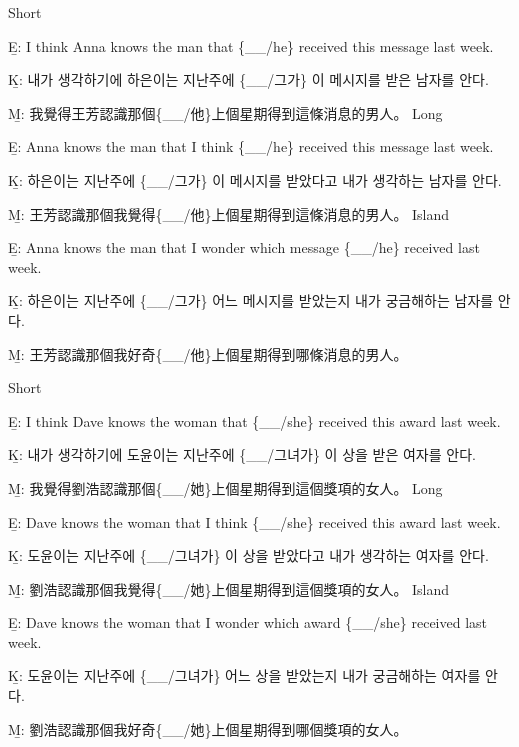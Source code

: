 \pex %
\a Short\par\nobreak
\beginsubsub
\b{E:} I think Anna knows the man that \{\_\_/he\} received this message last week.\par\nobreak
\b{K:} \ko 내가 생각하기에 하은이는 지난주에 \{\_\_/그가\} 이 메시지를 받은 남자를 안다. \normalfont\par\nobreak
\b{M:} \zh 我覺得王芳認識那個\{\_\_/他\}上個星期得到這條消息的男人。 \normalfont
\endsubsub
\a Long\par\nobreak
\beginsubsub
\b{E:} Anna knows the man that I think \{\_\_/he\} received this message last week.\par\nobreak
\b{K:} \ko 하은이는 지난주에 \{\_\_/그가\} 이 메시지를 받았다고 내가 생각하는 남자를 안다. \normalfont\par\nobreak
\b{M:} \zh 王芳認識那個我覺得\{\_\_/他\}上個星期得到這條消息的男人。 \normalfont
\endsubsub
\a Island\par\nobreak
\beginsubsub
\b{E:} Anna knows the man that I wonder which message \{\_\_/he\} received last week.\par\nobreak
\b{K:} \ko 하은이는 지난주에 \{\_\_/그가\} 어느 메시지를 받았는지 내가 궁금해하는 남자를 안다\normalfont.\par\nobreak
\b{M:} \zh 王芳認識那個我好奇\{\_\_/他\}上個星期得到哪條消息的男人。\normalfont
\endsubsub
\xe

\pex %
\a Short\par\nobreak
\beginsubsub
\b{E:} I think Dave knows the woman that \{\_\_/she\} received this award last week.\par\nobreak
\b{K:} \ko 내가 생각하기에 도윤이는 지난주에 \{\_\_/그녀가\} 이 상을 받은 여자를 안다. \normalfont\par\nobreak
\b{M:} \zh 我覺得劉浩認識那個\{\_\_/她\}上個星期得到這個獎項的女人。 \normalfont
\endsubsub
\a Long\par\nobreak
\beginsubsub
\b{E:} Dave knows the woman that I think \{\_\_/she\} received this award last week.\par\nobreak
\b{K:} \ko 도윤이는 지난주에 \{\_\_/그녀가\} 이 상을 받았다고 내가 생각하는 여자를 안다. \normalfont\par\nobreak
\b{M:} \zh 劉浩認識那個我覺得\{\_\_/她\}上個星期得到這個獎項的女人。 \normalfont
\endsubsub
\a Island\par\nobreak
\beginsubsub
\b{E:} Dave knows the woman that I wonder which award \{\_\_/she\} received last week.\par\nobreak
\b{K:} \ko 도윤이는 지난주에 \{\_\_/그녀가\} 어느 상을 받았는지 내가 궁금해하는 여자를 안다\normalfont.\par\nobreak
\b{M:} \zh 劉浩認識那個我好奇\{\_\_/她\}上個星期得到哪個獎項的女人。\normalfont
\endsubsub
\xe

